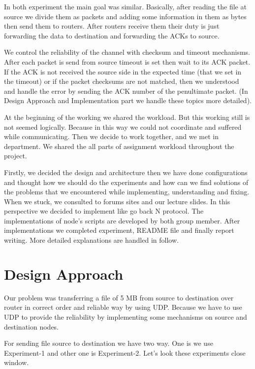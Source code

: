 \documentclass[letterpaper, 12 pt, conference]{ieeeconf}  %
\begin{document}
In both experiment the main goal was similar. Basically, after reading the file at source we divide them as packets and adding some information in them as bytes then send them to routers. After routers receive them their duty is just forwarding the data to destination and forwarding the ACKs to source. 
\vspace{1cm}

We control the reliability of the channel with checksum and timeout mechanisms. After each packet is send from source timeout is set then wait to its ACK packet. If the ACK is not received the source side in the expected time (that we set in the timeout) or if the packet checksums are not matched, then we understood and handle the error by sending the ACK number of the penultimate packet. (In Design Approach and Implementation part we handle these topics more detailed).
\vspace{1cm}

At the beginning of the working we shared the workload. But this working still is not seemed logically. Because in this way we could not coordinate and suffered while communicating. Then we decide to work together, and we met in department. We shared the all parts of assignment workload throughout the project. 
\vspace{1cm}

Firstly, we decided the design and architecture then we have done configurations and thought how we should do the experiments and how can we find solutions of the problems that we encountered while implementing, understanding and fixing. When we stuck, we consulted to forums sites and our lecture slides. In this perspective we decided to implement like go back N protocol. The implementations of node’s scripts are developed by both group member. After implementations we completed experiment, README file and finally report writing.
More detailed explanations are handled in follow.
\vspace{1cm}

\section{ Design Approach }
Our problem was transferring a file of 5 MB from source to destination over router in correct order and reliable way by using UDP. Because we have to use UDP to provide the reliability by implementing some mechanisms on source and destination nodes. 
\vspace{1cm}

For sending file source to destination we have two way. One is we use Experiment-1 and other one is Experiment-2. Let’s look these experiments close window.
\vspace{1cm}
\end{document}
